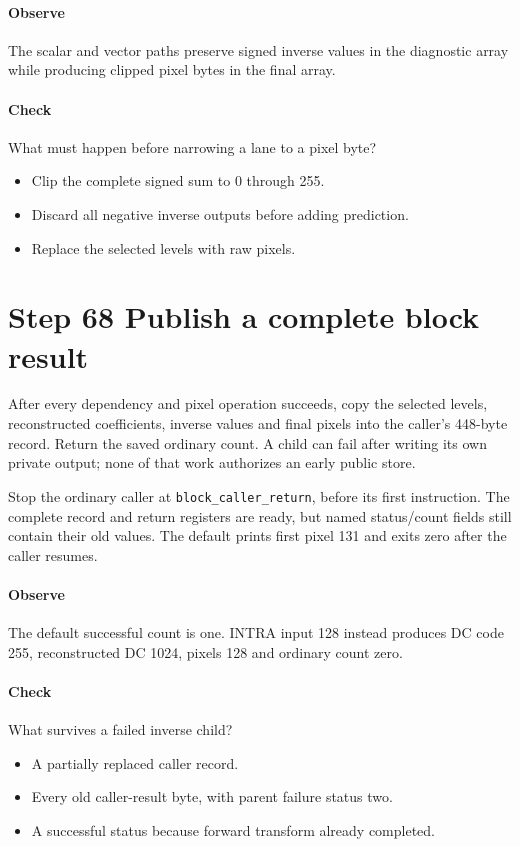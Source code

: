 \paragraph{Observe} The scalar and vector paths preserve signed inverse values
in the diagnostic array while producing clipped pixel bytes in the final array.
\paragraph{Check} What must happen before narrowing a lane to a pixel byte?
\begin{itemize}
  \item[A.] Clip the complete signed sum to 0 through 255.
  \item[B.] Discard all negative inverse outputs before adding prediction.
  \item[C.] Replace the selected levels with raw pixels.
\end{itemize}

\section{Step 68 Publish a complete block result}\label{h263-block-s08}
After every dependency and pixel operation succeeds, copy the selected levels,
reconstructed coefficients, inverse values and final pixels into the caller's
448-byte record. Return the saved ordinary count. A child can fail after writing
its own private output; none of that work authorizes an early public store.

Stop the ordinary caller at \texttt{block\_caller\_return}, before its first
instruction. The complete record and return registers are ready, but named
status/count fields still contain their old values. The default prints first
pixel 131 and exits zero after the caller resumes.

\paragraph{Observe} The default successful count is one. INTRA input 128 instead
produces DC code 255, reconstructed DC 1024, pixels 128 and ordinary count zero.
\paragraph{Check} What survives a failed inverse child?
\begin{itemize}
  \item[A.] A partially replaced caller record.
  \item[B.] Every old caller-result byte, with parent failure status two.
  \item[C.] A successful status because forward transform already completed.
\end{itemize}

